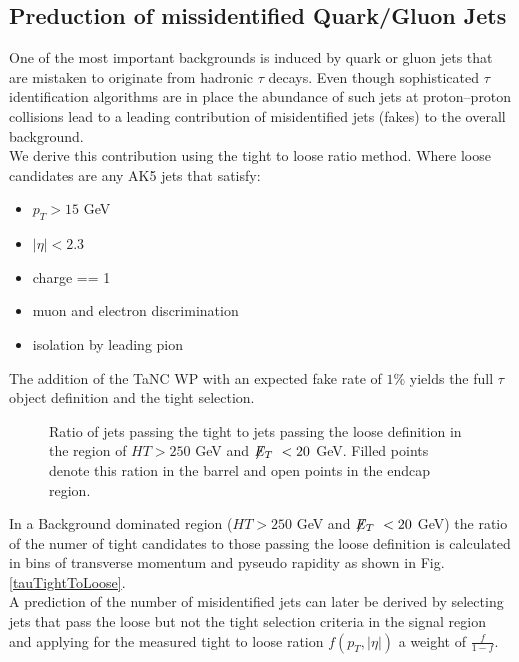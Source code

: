 \subsection{Preduction of missidentified Quark/Gluon Jets}\label{sec:tauFakeBackground}
One of the most important backgrounds is induced by quark or gluon jets that are mistaken to originate from hadronic $\tau$
decays. Even though sophisticated $\tau$ identification algorithms are in place the abundance of such jets at proton--proton
collisions lead to a leading contribution of misidentified jets (fakes) to the overall background.\\
We derive this contribution using the tight to loose ratio method. Where loose candidates are any AK5 jets that satisfy:
\begin{itemize}
\item $p_T > 15$ GeV
\item $|\eta| < 2.3$
\item charge == 1
\item muon and electron discrimination
\item isolation by leading pion
\end{itemize}
The addition of the TaNC WP with an expected fake rate of $1\%$ yields the full $\tau$ object definition and the tight
selection.
\begin{figure}[hbtp]
  \hfill
  \caption{Ratio of jets passing the tight to jets passing the loose definition in the region of $HT > 250$ GeV and $\displaystyle{\not} E_T~ <
    20$ GeV. Filled points denote this ration in the barrel and open points in the endcap region.}
\end{figure}
In a Background dominated region ($HT > 250$ GeV and $\displaystyle{\not} E_T~ < 20$ GeV) the ratio of the numer of tight candidates to those
passing the loose definition is calculated in bins of transverse momentum and pyseudo rapidity as shown in
Fig. \ref{tauTightToLoose}.\\

A prediction of the number of misidentified jets can later be derived by selecting jets that pass the loose but not the tight
selection criteria in the signal region and applying for the measured tight to loose ration $f(p_T, |\eta|)$ a weight of $\frac{f}{1-f}$.
